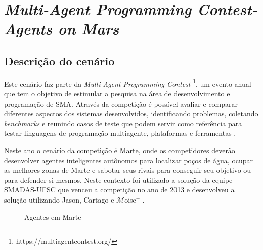 \section{\textit{Multi-Agent Programming Contest- Agents on Mars}}

\subsection{Descrição do cenário}

Este cenário faz parte da \textit{Multi-Agent Programming Contest} \footnote[1]{https://multiagentcontest.org/}, um evento anual que tem o objetivo de estimular a pesquisa na área de desenvolvimento e programação de SMA. Através da competição é possível avaliar e comparar diferentes aspectos dos sistemas desenvolvidos, identificando problemas, coletando \textit{benchmarks} e reunindo casos de teste que podem servir como referência para testar linguagens de programação multiagente, plataformas e ferramentas \cite{koster2012multi, ahlbrecht2013multi}.

Neste ano o cenário da competição é Marte, onde os competidores deverão desenvolver agentes inteligentes autônomos para localizar poços de água, ocupar
as melhores zonas de Marte e sabotar seus rivais para conseguir seu objetivo ou para defender si mesmos. Neste contexto foi utilizado a solução da equipe SMADAS-UFSC que venceu a competição no ano de 2013 e desenvolveu a solução utilizando Jason, Cartago e $\mathcal{M}$oise$^{+}$ \cite{zatelli2013smadas, ahlbrecht2013multi}.

\begin{figure}[ht]
  \centering
  \caption{Agentes em Marte}
  \label{fig:marte}
\end{figure}


